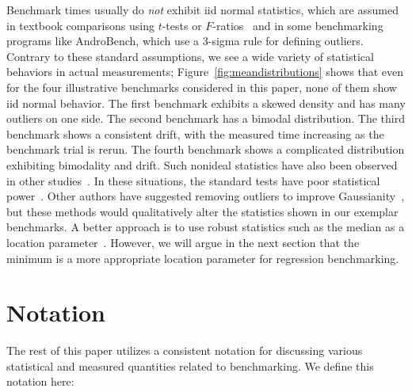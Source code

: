 \documentclass[conference]{IEEEtran}
\begin{document}
Benchmark times usually do \textit{not} exhibit iid normal statistics,
which are assumed in textbook comparisons using $t$-tests or
$F$-ratios~\cite{Lilja2000} and in some benchmarking programs like AndroBench,
which use a 3-sigma rule for defining outliers.
Contrary to these standard assumptions,
we see a wide variety of statistical behaviors in actual measurements;
Figure~\ref{fig:meandistributions} shows that even for the four illustrative
benchmarks considered in this paper, none of them show iid normal behavior.
The first benchmark exhibits a skewed density and has many outliers on one side.
The second benchmark has a bimodal distribution.
The third benchmark shows a consistent drift, with the measured time increasing
as the benchmark trial is rerun.
The fourth benchmark shows a complicated distribution exhibiting bimodality and
drift.
Such nonideal statistics have also been observed in other
studies~\cite{Gil2011,Chen2015,Rehn2015,Barrett2016}.
In these situations, the standard tests have poor statistical
power~\cite{Mytkowicz2009,Kalibera2013,Chen2015,Barrett2016}.
Other authors have suggested removing outliers to improve
Gaussianity~\cite{Rehn2015}, but these methods would
qualitatively alter the statistics shown in our exemplar benchmarks.
A better approach is to use robust statistics such as the median as a location
parameter~\cite{Hampel1971,Mytkowicz2009,Touati2013}.
However, we will argue in the next section that the minimum is a more appropriate
location parameter for regression benchmarking.

\label{sec:notation}
\section{Notation}

The rest of this paper utilizes a consistent notation for discussing various statistical and
measured quantities related to benchmarking. We define this notation here:
\end{document}
